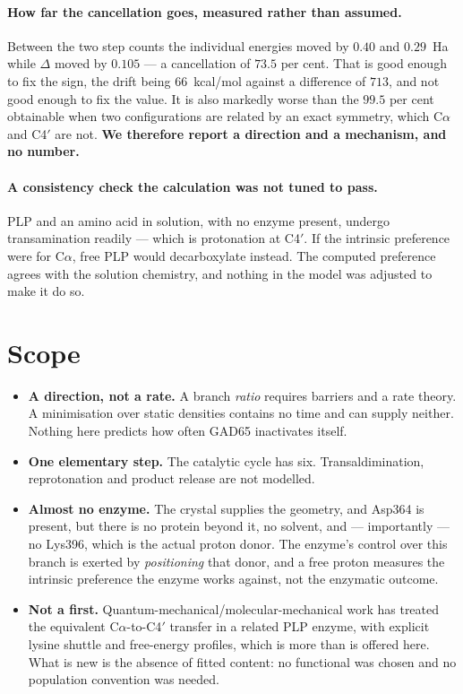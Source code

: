 \documentclass[11pt]{article}
\newcommand{\Ca}{C\ensuremath{\alpha}}
\newcommand{\Cfp}{C4\ensuremath{'}}
\begin{document}
\paragraph{How far the cancellation goes, measured rather than assumed.} Between the two step counts
the individual energies moved by $0.40$ and $0.29$~Ha while $\Delta$ moved by $0.105$ --- a
cancellation of $73.5$ per cent. That is good enough to fix the sign, the drift being $66$~kcal/mol
against a difference of $713$, and not good enough to fix the value. It is also markedly worse than
the $99.5$ per cent obtainable when two configurations are related by an exact symmetry, which
\Ca{} and \Cfp{} are not. \textbf{We therefore report a direction and a mechanism, and no number.}

\paragraph{A consistency check the calculation was not tuned to pass.} PLP and an amino acid in
solution, with no enzyme present, undergo transamination readily --- which is protonation at \Cfp{}.
If the intrinsic preference were for \Ca{}, free PLP would decarboxylate instead. The computed
preference agrees with the solution chemistry, and nothing in the model was adjusted to make it do
so.

\section{Scope}

\begin{itemize}
\item \textbf{A direction, not a rate.} A branch \emph{ratio} requires barriers and a rate theory. A
minimisation over static densities contains no time and can supply neither. Nothing here predicts how
often GAD65 inactivates itself.
\item \textbf{One elementary step.} The catalytic cycle has six. Transaldimination, reprotonation and
product release are not modelled.
\item \textbf{Almost no enzyme.} The crystal supplies the geometry, and Asp364 is present, but there
is no protein beyond it, no solvent, and --- importantly --- no Lys396, which is the actual proton
donor. The enzyme's control over this branch is exerted by \emph{positioning} that donor, and a free
proton measures the intrinsic preference the enzyme works against, not the enzymatic outcome.
\item \textbf{Not a first.} Quantum-mechanical/molecular-mechanical work has treated the equivalent
\Ca{}-to-\Cfp{} transfer in a related PLP enzyme, with explicit lysine shuttle and free-energy
profiles, which is more than is offered here. What is new is the absence of fitted content: no
functional was chosen and no population convention was needed.
\end{itemize}
\end{document}
